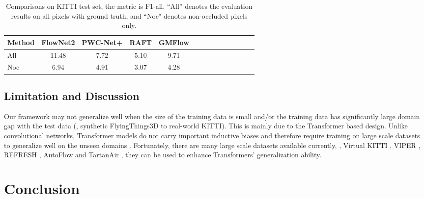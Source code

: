 \documentclass[10pt,twocolumn,letterpaper]{article}
\begin{document}
\begin{table}[t]
\footnotesize
    \centering
    \setlength{\tabcolsep}{3.pt} %
    
    \begin{tabular}{lccccccccccccc}
    \toprule
    
    
    Method & FlowNet2 \cite{ilg2017flownet} & PWC-Net+ \cite{sun2019models} & RAFT \cite{teed2020raft} & GMFlow \\
    
    \midrule
    
    All & 11.48 & 7.72 &  5.10 & 9.71 \\
    Noc & 6.94 & 4.91 & 3.07 & 4.28 \\

    \bottomrule
    \end{tabular}
    \vspace{-5pt}
    \caption{Comparisons on KITTI test set, the metric is F1-all. ``All'' denotes the evaluation results on all pixels with ground truth, and ``Noc" denotes non-occluded pixels only.}
    \label{tab:kitti_test_set}
    \vspace{-12pt}
\end{table}



\subsection{Limitation and Discussion}


Our framework may not generalize well when the size of the training data is small and/or the training data has significantly large domain gap with the test data (\eg, synthetic FlyingThings3D to real-world KITTI). This is mainly due to the Transformer based design. Unlike convolutional networks, Transformer models do not carry important inductive biases and therefore require training on large scale datasets to generalize well on the unseen domains \cite{dosovitskiy2020image,d2021convit,xu2021vitae}. Fortunately, there are many large scale datasets available currently, \eg, Virtual KITTI \cite{gaidon2016virtual,cabon2020virtual}, VIPER \cite{richter2017playing}, REFRESH \cite{lv2018learning}, AutoFlow \cite{sun2021autoflow} and TartanAir \cite{tartanair2020iros}, they can be used to enhance Transformers' generalization ability. 








\section{Conclusion}
\end{document}
